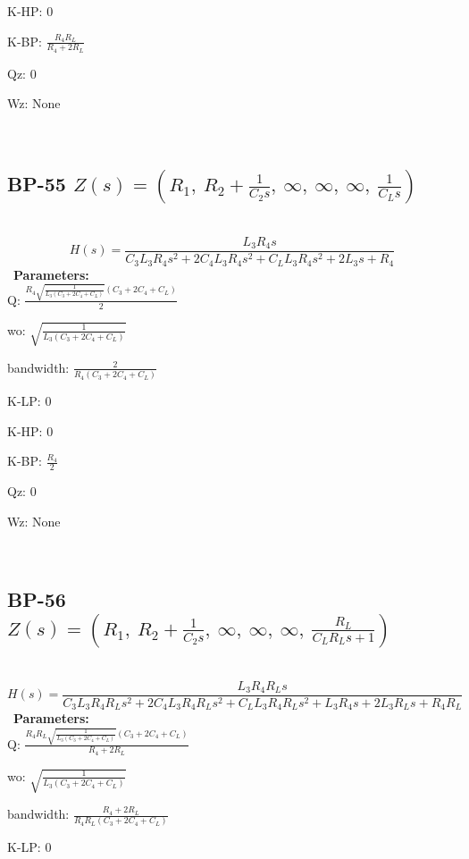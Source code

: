 \documentclass{article}
\begin{document}
K-HP: $0$\ 

K-BP: $\frac{R_{4} R_{L}}{R_{4} + 2 R_{L}}$\ 

Qz: $0$\ 

Wz: $\text{None}$\ 

\ 

\subsection{BP-55 $Z(s) = \left( R_{1}, \  R_{2} + \frac{1}{C_{2} s}, \  \infty, \  \infty, \  \infty, \  \frac{1}{C_{L} s}\right)$ } \ 
\textbf{\[H(s) = \frac{L_{3} R_{4} s}{C_{3} L_{3} R_{4} s^{2} + 2 C_{4} L_{3} R_{4} s^{2} + C_{L} L_{3} R_{4} s^{2} + 2 L_{3} s + R_{4}}\] } \ 
\textbf{Parameters:}\\ 

Q: $\frac{R_{4} \sqrt{\frac{1}{L_{3} \left(C_{3} + 2 C_{4} + C_{L}\right)}} \left(C_{3} + 2 C_{4} + C_{L}\right)}{2}$\ 

wo: $\sqrt{\frac{1}{L_{3} \left(C_{3} + 2 C_{4} + C_{L}\right)}}$\ 

bandwidth: $\frac{2}{R_{4} \left(C_{3} + 2 C_{4} + C_{L}\right)}$\ 

K-LP: $0$\ 

K-HP: $0$\ 

K-BP: $\frac{R_{4}}{2}$\ 

Qz: $0$\ 

Wz: $\text{None}$\ 

\ 

\subsection{BP-56 $Z(s) = \left( R_{1}, \  R_{2} + \frac{1}{C_{2} s}, \  \infty, \  \infty, \  \infty, \  \frac{R_{L}}{C_{L} R_{L} s + 1}\right)$ } \ 
\textbf{\[H(s) = \frac{L_{3} R_{4} R_{L} s}{C_{3} L_{3} R_{4} R_{L} s^{2} + 2 C_{4} L_{3} R_{4} R_{L} s^{2} + C_{L} L_{3} R_{4} R_{L} s^{2} + L_{3} R_{4} s + 2 L_{3} R_{L} s + R_{4} R_{L}}\] } \ 
\textbf{Parameters:}\\ 

Q: $\frac{R_{4} R_{L} \sqrt{\frac{1}{L_{3} \left(C_{3} + 2 C_{4} + C_{L}\right)}} \left(C_{3} + 2 C_{4} + C_{L}\right)}{R_{4} + 2 R_{L}}$\ 

wo: $\sqrt{\frac{1}{L_{3} \left(C_{3} + 2 C_{4} + C_{L}\right)}}$\ 

bandwidth: $\frac{R_{4} + 2 R_{L}}{R_{4} R_{L} \left(C_{3} + 2 C_{4} + C_{L}\right)}$\ 

K-LP: $0$\ 
\end{document}
